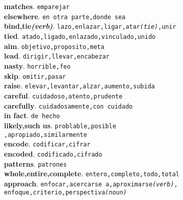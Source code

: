 \documentclass[twocolumn]{article}
\begin{document}
	\textsf{\textbf{matches}}. \texttt{emparejar}\\
	\textsf{\textbf{elsewhere}}. \texttt{en otra parte,donde sea}\\
	\textsf{\textbf{bind,tie{\scriptsize \textsl{(verb)}}}}. \texttt{lazo,enlazar,ligar,atar{\scriptsize \textsl{(tie)}},unir}\\
	\textsf{\textbf{tied}}. \texttt{atado,ligado,enlazado,vinculado,unido}\\
	\textsf{\textbf{aim}}. \texttt{objetivo,proposito,meta}\\
	\textsf{\textbf{lead}}. \texttt{dirigir,llevar,encabezar}\\
	\textsf{\textbf{nasty}}. \texttt{horrible,feo}\\
	\textsf{\textbf{skip}}. \texttt{omitir,pasar}\\
	\textsf{\textbf{raise}}. \texttt{elevar,levantar,alzar,aumento,subida}\\
	\textsf{\textbf{careful}}. \texttt{cuidadoso,atento,prudente}\\
	\textsf{\textbf{carefully}}. \texttt{cuidadosamente,con cuidado}\\
	\textsf{\textbf{in fact}}. \texttt{de hecho}\\
	\textsf{\textbf{likely,such us}}. \texttt{problable,posible\\,apropiado,similarmente}\\
	\textsf{\textbf{encode}}. \texttt{codificar,cifrar}\\
	\textsf{\textbf{encoded}}. \texttt{codificado,cifrado}\\
	\textsf{\textbf{patterns}}. \texttt{patrones}\\
	\textsf{\textbf{whole,entire,complete}}. \texttt{entero,completo,todo,total}\\
	\textsf{\textbf{approach}}. \texttt{enfocar,acercarse a,aproximarse{\scriptsize \textsl{(verb)}},\\enfoque,criterio,perspectiva{\scriptsize \textsl{(noun)}}}\\
\end{document}
